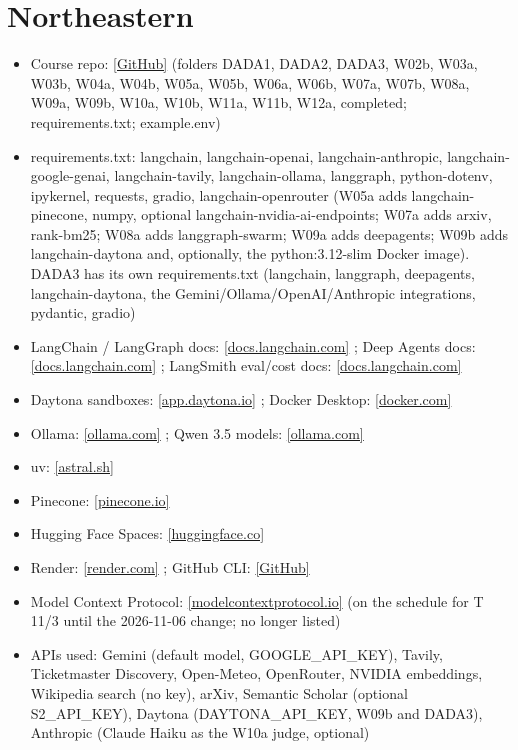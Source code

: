 \documentclass[10pt,oneside]{report}
\begin{document}
\section{Northeastern}
{\small\begin{itemize}
\item Course repo: \href{https://github.com/agenticllms/lecture-files}{[GitHub]} (folders DADA1, DADA2, DADA3, W02b, W03a, W03b, W04a, W04b, W05a, W05b, W06a, W06b, W07a, W07b, W08a, W09a, W09b, W10a, W10b, W11a, W11b, W12a, completed; requirements.txt; example.env)
\item requirements.txt: langchain, langchain-openai, langchain-anthropic, langchain-google-genai, langchain-tavily, langchain-ollama, langgraph, python-dotenv, ipykernel, requests, gradio, langchain-openrouter (W05a adds langchain-pinecone, numpy, optional langchain-nvidia-ai-endpoints; W07a adds arxiv, rank-bm25; W08a adds langgraph-swarm; W09a adds deepagents; W09b adds langchain-daytona and, optionally, the python:3.12-slim Docker image). DADA3 has its own requirements.txt (langchain, langgraph, deepagents, langchain-daytona, the Gemini/Ollama/OpenAI/Anthropic integrations, pydantic, gradio)
\item LangChain / LangGraph docs: \href{https://docs.langchain.com/oss/python/langgraph/workflows-agents}{[docs.langchain.com]} ; Deep Agents docs: \href{https://docs.langchain.com/oss/python/deepagents/overview}{[docs.langchain.com]} ; LangSmith eval/cost docs: \href{https://docs.langchain.com/langsmith/evaluation-concepts}{[docs.langchain.com]}
\item Daytona sandboxes: \href{https://app.daytona.io}{[app.daytona.io]} ; Docker Desktop: \href{https://www.docker.com/products/docker-desktop/}{[docker.com]}
\item Ollama: \href{https://ollama.com/download}{[ollama.com]} ; Qwen 3.5 models: \href{https://ollama.com/library/qwen3.5}{[ollama.com]}
\item uv: \href{https://astral.sh/uv/install.sh}{[astral.sh]}
\item Pinecone: \href{https://www.pinecone.io}{[pinecone.io]}
\item Hugging Face Spaces: \href{https://huggingface.co/new-space}{[huggingface.co]}
\item Render: \href{https://render.com}{[render.com]} ; GitHub CLI: \href{https://cli.github.com}{[GitHub]}
\item Model Context Protocol: \href{https://modelcontextprotocol.io/docs/getting-started/intro}{[modelcontextprotocol.io]} (on the schedule for T 11/3 until the 2026-11-06 change; no longer listed)
\item APIs used: Gemini (default model, GOOGLE\_\allowbreak{}API\_\allowbreak{}KEY), Tavily, Ticketmaster Discovery, Open-Meteo, OpenRouter, NVIDIA embeddings, Wikipedia search (no key), arXiv, Semantic Scholar (optional S2\_\allowbreak{}API\_\allowbreak{}KEY), Daytona (DAYTONA\_\allowbreak{}API\_\allowbreak{}KEY, W09b and DADA3), Anthropic (Claude Haiku as the W10a judge, optional)
\end{itemize}}
\end{document}

